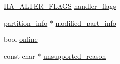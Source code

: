 \begin{DoxyCompactItemize}
\item 
\mbox{\hyperlink{classAlter__inplace__info_a45258f36b4942b5cabee7239463daaca}{H\+A\+\_\+\+A\+L\+T\+E\+R\+\_\+\+F\+L\+A\+GS}} \mbox{\hyperlink{classAlter__inplace__info_aacb64dbd4ca006d7203f84e41890dbfd}{handler\+\_\+flags}}
\item 
\mbox{\hyperlink{classpartition__info}{partition\+\_\+info}} $\ast$ \mbox{\hyperlink{classAlter__inplace__info_aa6d44a3120935d9ef9577beeb89f8c51}{modified\+\_\+part\+\_\+info}}
\item 
bool \mbox{\hyperlink{classAlter__inplace__info_acb2fbc0369799ac74f9cc74cb14d1bdf}{online}}
\item 
const char $\ast$ \mbox{\hyperlink{classAlter__inplace__info_a13eca57ab999f94ec5bf6b3c242cbb17}{unsupported\+\_\+reason}}
\end{DoxyCompactItemize}
